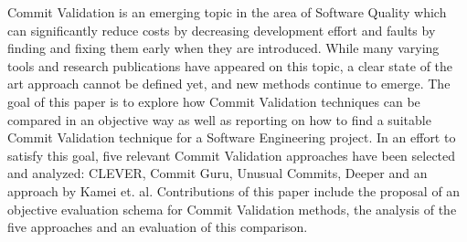 
Commit Validation is an emerging topic in the area of Software Quality which can significantly reduce costs by decreasing development effort and faults by finding and fixing them early when they are introduced. While many varying tools and research publications have appeared on this topic, a clear state of the art approach 
cannot be defined yet, and new methods continue to emerge.
The goal of this paper is to explore how Commit Validation techniques can be compared in an objective way as well as reporting on how to find a suitable Commit Validation technique for a Software Engineering project.
In an effort to satisfy this goal, five relevant Commit Validation approaches have been selected and analyzed: CLEVER, Commit Guru, Unusual Commits, Deeper and an approach by Kamei et. al.
Contributions of this paper include the proposal of an objective evaluation schema for Commit Validation methods, the analysis of the five approaches and an evaluation of this comparison.